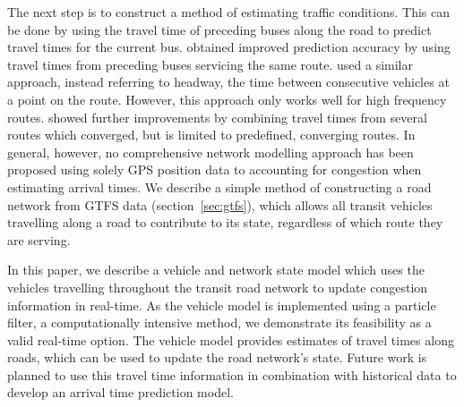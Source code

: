 The next step is to construct a method of estimating traffic conditions.
This can be done by using the travel time of preceding buses along the road
to predict travel times for the current bus.
\cite{Yu_2010} obtained improved prediction accuracy by using travel times
from preceding buses servicing the same route.
\cite{Hans_2015} used a similar approach,
instead referring to headway, the time between consecutive vehicles
at a point on the route.
However, this approach only works well for high frequency routes.
\cite{Yu_2011} showed further improvements by combining travel times 
from several routes which converged,
but is limited to predefined, converging routes.
In general, however, no comprehensive network modelling approach has been proposed using
solely GPS position data to accounting for congestion when estimating arrival times.
We describe a simple method of constructing a road network
from GTFS data (section~\ref{sec:gtfs}),
which allows all transit vehicles travelling along a road to contribute to its state,
regardless of which route they are serving.

In this paper, we describe a \rt vehicle and network state
model which uses the vehicles travelling throughout the transit road network
to update congestion information in real-time.
As the vehicle model is implemented using a particle filter,
a computationally intensive method,
we demonstrate its feasibility as a valid real-time option.
The vehicle model provides estimates of travel times along roads,
which can be used to update the road network's state.
Future work is planned to use this travel time information 
in combination with historical data to develop an arrival time prediction model.




